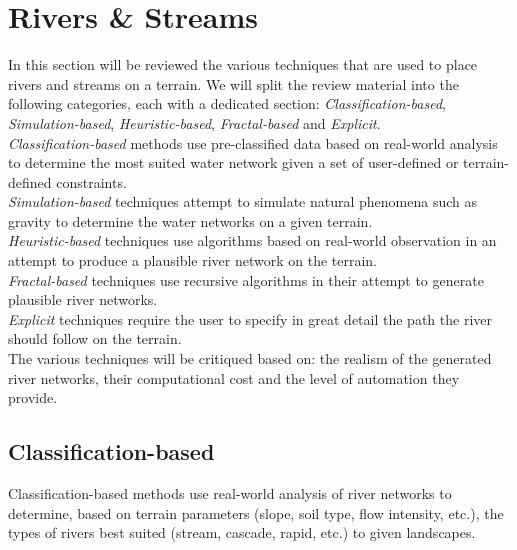 \section{Rivers \& Streams}

In this section will be reviewed the various techniques that are used to place rivers and streams on a terrain. We will split the review material into the following categories, each with a dedicated section: \textit{Classification-based}, \textit{Simulation-based}, \textit{Heuristic-based}, \textit{Fractal-based} and \textit{Explicit}.\\ 
\textit{Classification-based} methods use pre-classified data based on real-world analysis to determine the most suited water network given a set of user-defined or terrain-defined constraints.\\
\textit{Simulation-based} techniques attempt to simulate natural phenomena such as gravity to determine the water networks on a given terrain.\\
\textit{Heuristic-based} techniques use algorithms based on real-world observation in an attempt to produce a plausible river network on the terrain. \\
\textit{Fractal-based} techniques use recursive algorithms in their attempt to generate plausible river networks. \\
\textit{Explicit} techniques require the user to specify in great detail the path the river should follow on the terrain.\\

The various techniques will be critiqued based on: the realism of the generated river networks, their computational cost and the level of automation they provide.

\subsection{Classification-based}

Classification-based methods use real-world analysis of river networks to determine, based on terrain parameters (slope, soil type, flow intensity, etc.), the types of rivers best suited (stream, cascade, rapid, etc.) to given landscapes.\\


